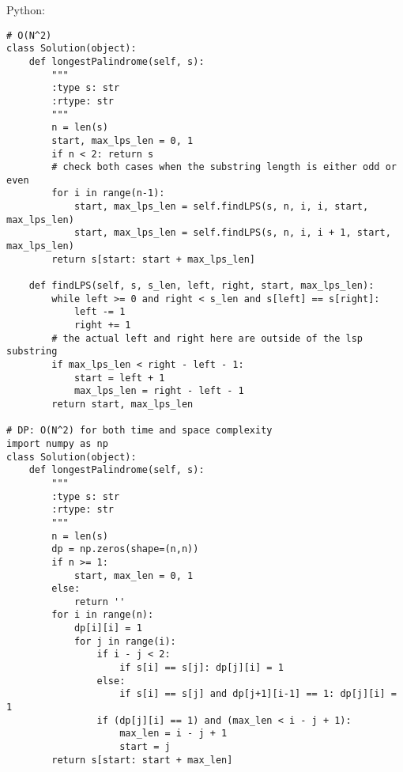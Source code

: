 Python:
\lstset{language=python}
\begin{lstlisting}
# O(N^2)
class Solution(object):
    def longestPalindrome(self, s):
        """
        :type s: str
        :rtype: str
        """
        n = len(s)
        start, max_lps_len = 0, 1
        if n < 2: return s 
        # check both cases when the substring length is either odd or even
        for i in range(n-1):
            start, max_lps_len = self.findLPS(s, n, i, i, start, max_lps_len)
            start, max_lps_len = self.findLPS(s, n, i, i + 1, start, max_lps_len)
        return s[start: start + max_lps_len]
    
    def findLPS(self, s, s_len, left, right, start, max_lps_len):
        while left >= 0 and right < s_len and s[left] == s[right]:
            left -= 1
            right += 1
        # the actual left and right here are outside of the lsp substring
        if max_lps_len < right - left - 1:
            start = left + 1
            max_lps_len = right - left - 1
        return start, max_lps_len
    
# DP: O(N^2) for both time and space complexity
import numpy as np
class Solution(object):
    def longestPalindrome(self, s):
        """
        :type s: str
        :rtype: str
        """
        n = len(s)
        dp = np.zeros(shape=(n,n))
        if n >= 1:
            start, max_len = 0, 1
        else:
            return ''
        for i in range(n):
            dp[i][i] = 1
            for j in range(i):
                if i - j < 2:
                    if s[i] == s[j]: dp[j][i] = 1
                else:
                    if s[i] == s[j] and dp[j+1][i-1] == 1: dp[j][i] = 1
                if (dp[j][i] == 1) and (max_len < i - j + 1):
                    max_len = i - j + 1
                    start = j
        return s[start: start + max_len]
\end{lstlisting}

